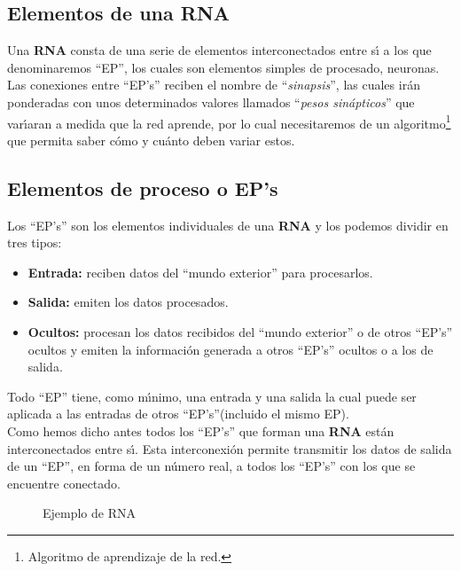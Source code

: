 \subsection{Elementos de una RNA}

Una \textbf{RNA} consta de una serie de elementos interconectados entre s\'{\i}
a los que denominaremos ``EP'', los cuales son elementos simples de procesado,
neuronas. Las conexiones entre ``EP's'' reciben el nombre de
``\emph{sinapsis}'', las cuales ir\'an ponderadas con unos determinados valores
llamados ``\emph{pesos sin\'apticos}'' que var\'{\i}aran a medida que la red
aprende, por lo cual necesitaremos de un algoritmo\footnote{Algoritmo de
aprendizaje de la red.} que permita saber c\'omo y
cu\'anto deben variar estos.
\subsection{Elementos de proceso o EP's}

Los ``EP's'' son los elementos individuales de una \textbf{RNA} y los podemos
dividir en tres tipos:

\begin{itemize}
\item \textbf{Entrada:} reciben datos del ``mundo exterior'' para procesarlos.
\item \textbf{Salida:} emiten los datos procesados.
\item \textbf{Ocultos:} procesan los datos recibidos del ``mundo exterior'' o
de otros ``EP's'' ocultos y emiten la informaci\'on generada a otros ``EP's''
ocultos o a los de salida.
\end{itemize}

Todo ``EP'' tiene, como m\'{\i}nimo, una entrada y una salida la cual puede ser
aplicada a las entradas de otros ``EP's''(incluido el mismo EP).\\

Como hemos dicho antes todos los ``EP's'' que forman una \textbf{RNA} est\'an
interconectados entre s\'{\i}. Esta interconexi\'on permite transmitir los
datos de salida de un ``EP'', en forma de un n\'umero real, a todos los ``EP's''
con los que se encuentre conectado.

\begin{figure}[!ht]

\caption{Ejemplo de RNA} \label{fig:RNA}
\end{figure}

